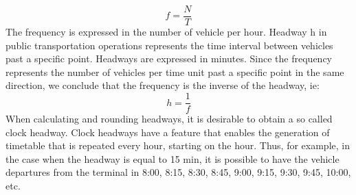 \begin{equation}
	f = \frac{N}{T}
\end{equation}
The frequency is expressed in the number of vehicle per hour. Headway h in public transportation operations represents the time interval between vehicles past a specific point. Headways are expressed in minutes. Since the frequency represents the number of vehicles per time unit past a specific point in the same direction, we conclude that the frequency is the inverse of the headway, ie:
\begin{equation}
	h = \frac{1}{f}
\end{equation}
When calculating and rounding headways, it is desirable to obtain a so called clock headway. Clock headways have a feature that enables the generation of timetable that is repeated every hour, starting on the hour. Thus, for example, in the case when the headway is equal to 15 min, it is possible to have the vehicle departures from the terminal in 8:00, 8:15, 8:30, 8:45, 9:00, 9:15, 9:30, 9:45, 10:00, etc.
%
